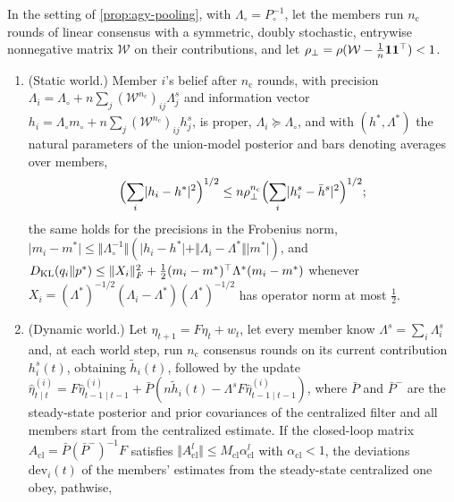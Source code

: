 \begin{proposition}\label{prop:agy-consensus}
In the setting of \cref{prop:agy-pooling}, with $\Lambda_\circ=P_\circ^{-1}$, let the members run $n_{\mathrm c}$ rounds of linear consensus with a symmetric, doubly stochastic, entrywise nonnegative matrix $\mathcal W$ on their contributions, and let $\rho_\perp=\rho(\mathcal W-\frac1n\mathbf{1}\mathbf{1}^\top)<1$.
\begin{enumerate}
\item[(a)] (Static world.) Member $i$'s belief after $n_{\mathrm c}$ rounds, with precision $\Lambda_i=\Lambda_\circ+n\sum_j(\mathcal W^{n_{\mathrm c}})_{ij}\Lambda^s_j$ and information vector $h_i=\Lambda_\circ m_\circ+n\sum_j(\mathcal W^{n_{\mathrm c}})_{ij}h^s_j$, is proper, $\Lambda_i\succeq\Lambda_\circ$, and with $(h^\ast,\Lambda^\ast)$ the natural parameters of the union-model posterior and bars denoting averages over members,
\begin{equation}\label{eq:agy-consensus-static}
\Bigl(\sum_i\lvert h_i-h^\ast\rvert^2\Bigr)^{1/2}\le n\rho_\perp^{n_{\mathrm c}}\Bigl(\sum_i\lvert h^s_i-\bar h^s\rvert^2\Bigr)^{1/2};
\end{equation}
the same holds for the precisions in the Frobenius norm, $\lvert m_i-m^\ast\rvert\le\Vert\Lambda_\circ^{-1}\Vert(\lvert h_i-h^\ast\rvert+\Vert\Lambda_i-\Lambda^\ast\Vert\lvert m^\ast\rvert)$, and $D_{\mathrm{KL}}(q_i\Vert p^\ast)\le\Vert X_i\Vert_F^2+\frac12(m_i-m^\ast)^\top\Lambda^\ast(m_i-m^\ast)$ whenever $X_i=(\Lambda^\ast)^{-1/2}(\Lambda_i-\Lambda^\ast)(\Lambda^\ast)^{-1/2}$ has operator norm at most $\frac12$.
\item[(b)] (Dynamic world.) Let $\eta_{t+1}=F\eta_t+w_t$, let every member know $\Lambda^s=\sum_i\Lambda^s_i$ and, at each world step, run $n_{\mathrm c}$ consensus rounds on its current contribution $h^s_i(t)$, obtaining $\tilde h_i(t)$, followed by the update $\hat\eta^{(i)}_{t\mid t}=F\hat\eta^{(i)}_{t-1\mid t-1}+\bar P(n\tilde h_i(t)-\Lambda^sF\hat\eta^{(i)}_{t-1\mid t-1})$, where $\bar P$ and $\bar P^-$ are the steady-state posterior and prior covariances of the centralized filter and all members start from the centralized estimate. If the closed-loop matrix $A_{\mathrm{cl}}=\bar P(\bar P^-)^{-1}F$ satisfies $\Vert A_{\mathrm{cl}}^l\Vert\le M_{\mathrm{cl}}\alpha_{\mathrm{cl}}^l$ with $\alpha_{\mathrm{cl}}<1$, the deviations $\mathrm{dev}_i(t)$ of the members' estimates from the steady-state centralized one obey, pathwise,
\begin{equation}\label{eq:agy-consensus-dynamic}

\end{equation}
\end{enumerate}
\end{proposition}
